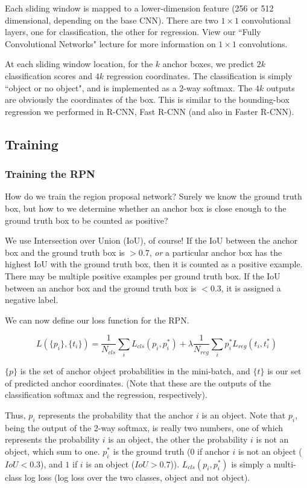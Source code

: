 \documentclass{article}
\begin{document}
Each sliding window is mapped to a lower-dimension feature (256 or 512 dimensional, depending on the base CNN). There are two $1\times1$ convolutional layers, one for classification, the other for regression. View our ``Fully Convolutional Networks" lecture for more information on $1\times1$ convolutions.

At each sliding window location, for the $k$ anchor boxes, we predict $2k$ classification scores and $4k$ regression coordinates. The classification is simply ``object or no object", and is implemented as a 2-way softmax. The $4k$ outputs are obviously the coordinates of the box. This is similar to the bounding-box regression we performed in R-CNN, Fast R-CNN (and also in Faster R-CNN).

\subsection{Training}
\subsubsection{Training the RPN}
How do we train the region proposal network? Surely we know the ground truth box, but how to we determine whether an anchor box is close enough to the ground truth box to be counted as positive?

We use Intersection over Union (IoU), of course! If the IoU between the anchor box and the ground truth box is $>0.7$, \textit{or} a particular anchor box has the highest IoU with the ground truth box, then it is counted as a positive example. There may be multiple positive examples per ground truth box. If the IoU between an anchor box and the ground truth box is $<0.3$, it is assigned a negative label.

We can now define our loss function for the RPN.

\[L(\{p_i\}, \{t_i\}) = \frac{1}{N_{cls}}\sum_iL_{cls}(p_i,p_i^*) + \lambda\frac{1}{N_{reg}}\sum_ip_i^*L_{reg}(t_i,t_i^*)\]

$\{p\}$ is the set of anchor object probabilities in the mini-batch, and $\{t\}$ is our set of predicted anchor coordinates. (Note that these are the outputs of the classification softmax and the regression, respectively).

Thus, $p_i$ represents the probability that the anchor $i$ is an object. Note that $p_i$, being the output of the 2-way softmax, is really two numbers, one of which represents the probability $i$ is an object, the other the probability $i$ is not an object, which sum to one. $p_i^*$ is the ground truth ($0$ if anchor $i$ is not an object ($IoU < 0.3$), and $1$ if $i$ is an object ($IoU > 0.7$)). $L_{cls}(p_i,p_i^*)$ is simply a multi-class log loss (log loss over the two classes, object and not object).
\end{document}
